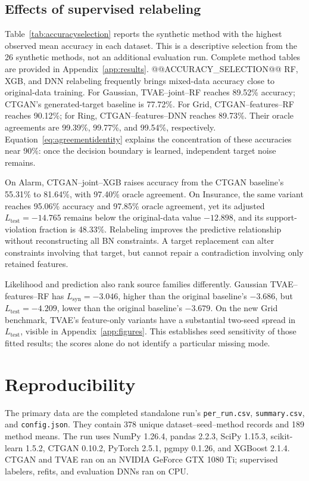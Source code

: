 \documentclass[11pt,letterpaper]{article}
\newcommand{\Lsyn}{L_{\mathrm{syn}}}
\newcommand{\Ltest}{L_{\mathrm{test}}}
\begin{document}
\subsection{Effects of supervised relabeling}
Table~\ref{tab:accuracyselection} reports the synthetic method with the highest observed mean accuracy in each dataset. This is a descriptive selection from the 26 synthetic methods, not an additional evaluation run. Complete method tables are provided in Appendix~\ref{app:results}.
@@ACCURACY_SELECTION@@
RF, XGB, and DNN relabeling frequently brings mixed-data accuracy close to original-data training. For Gaussian, TVAE--joint--RF reaches 89.52\% accuracy; CTGAN's generated-target baseline is 77.72\%. For Grid, CTGAN--features--RF reaches 90.12\%; for Ring, CTGAN--features--DNN reaches 89.73\%. Their oracle agreements are 99.39\%, 99.77\%, and 99.54\%, respectively. Equation~\eqref{eq:agreementidentity} explains the concentration of these accuracies near 90\%: once the decision boundary is learned, independent target noise remains.

On Alarm, CTGAN--joint--XGB raises accuracy from the CTGAN baseline's 55.31\% to 81.64\%, with 97.40\% oracle agreement. On Insurance, the same variant reaches 95.06\% accuracy and 97.85\% oracle agreement, yet its adjusted $\Ltest=-14.765$ remains below the original-data value $-12.898$, and its support-violation fraction is 48.33\%. Relabeling improves the predictive relationship without reconstructing all BN constraints. A target replacement can alter constraints involving that target, but cannot repair a contradiction involving only retained features.

Likelihood and prediction also rank source families differently. Gaussian TVAE--features--RF has $\Lsyn=-3.046$, higher than the original baseline's $-3.686$, but $\Ltest=-4.209$, lower than the original baseline's $-3.679$. On the new Grid benchmark, TVAE's feature-only variants have a substantial two-seed spread in $\Ltest$, visible in Appendix~\ref{app:figures}. This establishes seed sensitivity of those fitted results; the scores alone do not identify a particular missing mode.

\section{Reproducibility}
The primary data are the completed standalone run's \texttt{per\_run.csv}, \texttt{summary.csv}, and \texttt{config.json}. They contain 378 unique dataset--seed--method records and 189 method means. The run uses NumPy 1.26.4, pandas 2.2.3, SciPy 1.15.3, scikit-learn 1.5.2, CTGAN 0.10.2, PyTorch 2.5.1, pgmpy 0.1.26, and XGBoost 2.1.4. CTGAN and TVAE ran on an NVIDIA GeForce GTX 1080 Ti; supervised labelers, refits, and evaluation DNNs ran on CPU.
\end{document}
